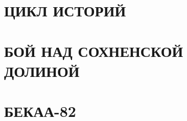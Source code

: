 \documentclass[11pt,fleqn,oneside]{book} %
\begin{document}

\pagestyle{empty} %
\label{tablecont}
\tableofcontents %


\pagestyle{fancy} %




\part{ЦИКЛ ИСТОРИЙ}





\part{БОЙ НАД СОХНЕНСКОЙ ДОЛИНОЙ}












\part{БЕКАА-82}



\end{document}
